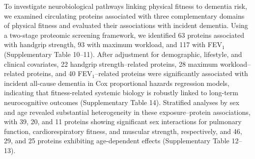 \documentclass{article}
\begin{document}
To investigate neurobiological pathways linking physical fitness to dementia risk, we examined circulating proteins associated with three complementary domains of physical fitness and evaluated their associations with incident dementia. Using a two-stage proteomic screening framework, we identified 63 proteins associated with handgrip strength, 93 with maximum workload, and 117 with FEV$_1$ (Supplementary Table 10--11). After adjustment for demographic, lifestyle, and clinical covariates, 22 handgrip strength–related proteins, 28 maximum workload–related proteins, and 40 FEV$_1$–related proteins were significantly associated with incident all-cause dementia in Cox proportional hazards regression models, indicating that fitness-related systemic biology is robustly linked to long-term neurocognitive outcomes (Supplementary Table 14). Stratified analyses by sex and age revealed substantial heterogeneity in these exposure–protein associations, with 39, 20, and 11 proteins showing significant sex interactions for pulmonary function, cardiorespiratory fitness, and muscular strength, respectively, and 46, 29, and 25 proteins exhibiting age-dependent effects (Supplementary Table 12--13).
\end{document}
